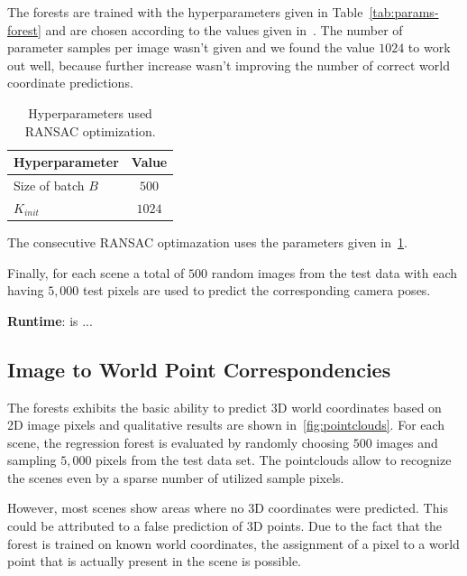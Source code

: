 \documentclass[final]{cvpr}
\begin{document}
The forests are trained with the hyperparameters given in Table~\ref{tab:params-forest} and are chosen according to the 
values given in~\cite{shotton2013}. The number of parameter samples per image wasn't given and we found the
value $1024$ to work out well, because further increase wasn't improving the number of correct world coordinate predictions.

\begin{table}[h!]
	\begin{center}
	\begin{tabular}{|l|c|}
	\hline
	Hyperparameter & Value \\
	\hline\hline
	Size of batch $B$ & $500$ \\
	$K_{init}$ & $1024$ \\
	
	\hline
	\end{tabular}
	\end{center}
	\label{tab:params-ransac}
	\caption{Hyperparameters used RANSAC optimization.}
\end{table}

The consecutive RANSAC optimazation uses the parameters given in~\ref{tab:params-ransac}. 


Finally, for each scene a total of $500$ random images from the test data with each having $5,000$ test pixels are used
to predict the corresponding camera poses. 

\textbf{Runtime}: is ...



\subsection{Image to World Point Correspondencies}
The forests exhibits the basic ability to predict 3D world coordinates based on 2D image pixels and 
qualitative results are shown in~\ref{fig:pointclouds}. For each scene, the regression forest is evaluated by 
randomly choosing $500$ images and sampling $5,000$ pixels from the test data set. The pointclouds 
allow to recognize the scenes even by a sparse number of utilized sample pixels. 

However, most scenes show areas where no 3D coordinates
were predicted. This could be attributed to a false prediction of 3D points. Due to the fact that the forest is 
trained on known world coordinates, the assignment of a pixel to a world point that is actually present in the 
scene is possible. 
\end{document}
